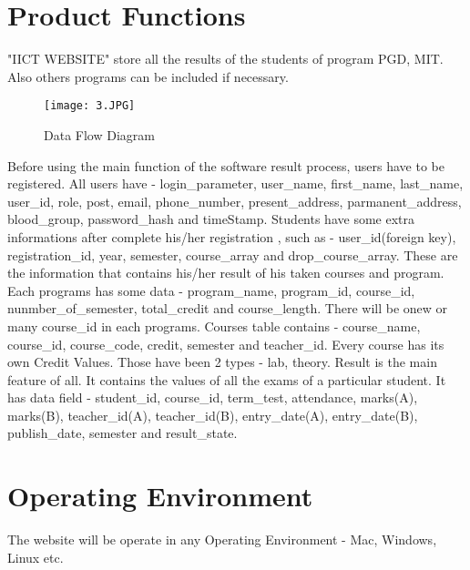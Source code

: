 \documentclass{scrreprt}
\begin{document}
    \section{Product Functions}
    "IICT WEBSITE" store all the results of the students of program PGD, MIT. Also others programs can be included if necessary.
    \begin{figure}[h!]
        \centering
        \texttt{[image: 3.JPG]}
        \caption{Data Flow Diagram}
        \label{fig:Data Flow Diagram}
    \end{figure}
    Before using the main function of the software result process, users have to be registered.
    \newline
    All users have - login\_parameter, user\_name, first\_name, last\_name, user\_id, role, post, email, phone\_number, present\_address, parmanent\_address, blood\_group, password\_hash and timeStamp.
    \newline
    Students have some extra informations after complete his/her registration , such as - user\_id(foreign key), registration\_id, year, semester, course\_array and drop\_course\_array. These are the information that contains his/her result of his taken courses and program.
    \newline
    Each programs has some data - program\_name, program\_id, course\_id, nunmber\_of\_semester, total\_credit and course\_length. There will be onew or many course\_id in each programs.
    \newline
    Courses table contains - course\_name, course\_id, course\_code, credit, semester and teacher\_id.
    \newline
    Every course has its own Credit Values. Those have been 2 types - lab, theory.
    \newline
    Result is the main feature of all. It contains the values of all the exams of a particular student. It has data field - student\_id, course\_id, term\_test, attendance, marks(A), marks(B), teacher\_id(A), teacher\_id(B), entry\_date(A), entry\_date(B), publish\_date, semester	and result\_state.

    \section{Operating Environment}
    The website will be operate in any Operating Environment - Mac, Windows, Linux etc.
\end{document}

